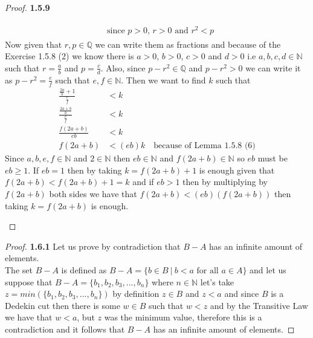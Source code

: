 \documentclass[11pt]{article}
\newcommand{\N}{\mathbb{N}}
\newcommand{\Q}{\mathbb{Q}}
\theoremstyle{definition}
\begin{document}
\begin{proof}{\textbf{1.5.9}}
\begin{itemize}
\begin{align*}
\begin{aligned}
                        &\text{since }p>0 \text{, }r>0\text{ and }r^2<p\end{aligned}
        \end{align*}
        Now given that $r,p \in \Q$ we can write them as fractions and because of the
        Exercise 1.5.8 (2) we know there is $a>0$, $b>0$, $c>0$ and $d>0$ i.e
        $a,b,c,d \in \N$ such that $r=\frac{a}{b}$ and $p=\frac{c}{d}$. Also, since
        $p-r^2 \in \Q$ and $p-r^2>0$ we can write it as $p-r^2=\frac{e}{f}$ such that
        $e,f \in \N$. Then we want to find $k$ such that
        \begin{align*}
            \frac{\frac{2a}{b}+1}{\frac{e}{f}} &< k\\
            \frac{\frac{2a+ b}{b}}{\frac{e}{f}} &< k \\
            \frac{f(2a+b)}{eb} &< k \\
            f(2a+b) &< (eb)k \quad \text{because of Lemma 1.5.8 (6)}
        \end{align*}
        Since $a,b,e,f \in \N$ and $2 \in \N$ then $eb \in \N$ and $f(2a+b) \in \N$
        so $eb$ must be $eb \geq 1$. If $eb=1$ then by taking $k = f(2a+b) + 1$ is
        enough given that $f(2a+b) < f(2a+b) + 1 = k$ and if $eb > 1$ then by
        multiplying by $f(2a+b)$ both sides we have that $f(2a+b) < (eb)(f(2a+b))$
        then taking $k = f(2a+b)$ is enough. 
    \end{itemize}
    \end{proof}
\cleardoublepage 
    \begin{proof}{\textbf{1.6.1}}
        Let us prove by contradiction that $B-A$ has an infinite amount of elements.\\
        The set $B-A$ is defined as
        $B-A = \{b \in B ~|~ b<a \text{ for all }a \in A\}$ and let us suppose that 
        $B-A = \{b_1, b_2, b_3, ... , b_n\}$
        where $n \in \N$ let's take $z = min(\{b_1,b_2,b_3,...,b_n\})$ by definition
        $z \in B$ and $z<a$ and since $B$ is a Dedekin cut then there is some $w \in B$
        such that $w<z$ and by the Transitive Law we have that $w<a$, but $z$ was the
        minimum value, therefore this is a contradiction and it follows that $B-A$ has
        an infinite amount of elements.
    \end{proof}
\end{document}
